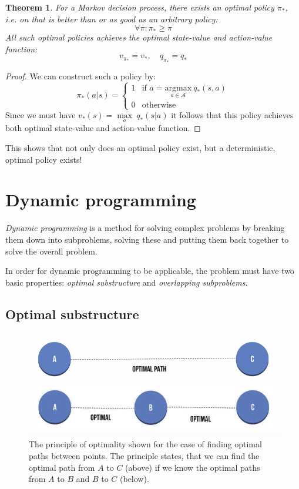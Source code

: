 \documentclass[12pt, a4paper]{article}
\newtheorem{theorem}{Theorem}[section]
\numberwithin{equation}{section}
\begin{document}
\begin{theorem}
For a Markov decision process, there exists an optimal policy $\pi_*$, i.e. on that is better than or as good as an arbitrary policy:
\begin{equation}
\forall\pi: \pi_*\ge\pi
\end{equation}
All such optimal policies achieves the optimal state-value and action-value function:
\begin{equation}
v_{\pi_*}=v_*,\quad q_{\pi_*}=q_*
\end{equation}
\end{theorem}
\begin{proof}
We can construct such a policy by:
\begin{equation}
\pi_*(a|s)=\begin{cases}
1 & \textrm{if } a=\underset{a\in\mathcal{A}}{\textrm{argmax}}\ q_*(s,a) \\
0 & \textrm{otherwise} 
\end{cases}
\end{equation}
Since we must have $v_*(s)=\underset{a}{\max}\ q_*(s|a)$ it follows that this policy achieves both optimal state-value and action-value function.
\end{proof}

This shows that not only does an optimal policy exist, but a deterministic, optimal policy exists!

\section{Dynamic programming}
\textit{Dynamic programming} is a method for solving complex problems by breaking them down into subproblems, solving these and putting them back together to solve the overall problem.

In order for dynamic programming to be applicable, the problem must have two basic properties: \textit{optimal substructure} and \textit{overlapping subproblems}.

\subsection{Optimal substructure}

\begin{figure}
\centering
\includegraphics[width=\textwidth]{principle_of_optimality}
\caption{The principle of optimality shown for the case of finding optimal paths between points. The principle states, that we can find the optimal path from $A$ to $C$ (above) if we know the optimal paths from $A$ to $B$ and $B$ to $C$ (below).}
\label{fig:principle_of_optimality}
\end{figure}
\end{document}
